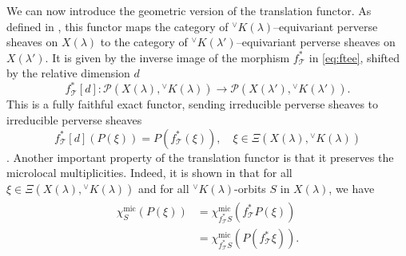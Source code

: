 \documentclass[a4paper, 11pt]{article}
\begin{document}
We can now introduce the geometric version of the
translation functor.   
As defined in \cite[Proposition~8.8(b)]{ABV}, this functor maps the
category of \({}^{\vee}K(\lambda)\)–equivariant perverse sheaves on
\(X(\lambda)\) to the category of \({}^{\vee}K(\lambda')\)–equivariant
perverse sheaves on \(X(\lambda')\).   
It is given by the inverse image of the morphism
$f_\mathcal{T}^{\ast}$ in \eqref{eq:ftee}, shifted by the relative
dimension \(d\) 
\begin{equation}\label{eq:geometricTF}
f^{*}_{\mathcal{T}}[d]: \mathcal{P}\left(
X(\lambda),{}^{\vee}K(\lambda)\right) \longrightarrow \mathcal{P}\left(
X(\lambda'),{}^{\vee}K(\lambda')\right).
\end{equation}
This is a fully faithful exact functor, sending irreducible perverse
sheaves to irreducible perverse sheaves
\[
f^{\ast}_{\mathcal{T}}[d]\left(P(\xi)\right) =
P(f_\mathcal{T}^{\ast}(\xi)), \quad \xi \in  \Xi(X(\lambda), {}^{\vee}K(\lambda))
\]
 \cite[Proposition
  7.15(b)]{ABV}.
Another important property of the translation functor is that it
preserves the microlocal multiplicities. 
Indeed, it is shown
in \cite[Proposition 20.1 (e)]{ABV} that for all \(\xi \in
\Xi(X(\lambda), {}^{\vee}K(\lambda))\) and for all
\({}^{\vee}K(\lambda)\)-orbits \(S\) in \(X(\lambda)\), we have 
\begin{align}
\begin{aligned}\label{eq:translationofchiV1}
\chi_{S}^{\mathrm{mic}}(P(\xi)) &=
\chi_{f^{\ast}_{\mathcal{T}}S}^{\mathrm{mic}}(f^{\ast}_{\mathcal{T}}P(\xi))
\\ 
&= \chi_{f^{\ast}_{\mathcal{T}}S}^{\mathrm{mic}}(P(f^{\ast}_{\mathcal{T}}\xi)).
\end{aligned}
\end{align}
\end{document}
